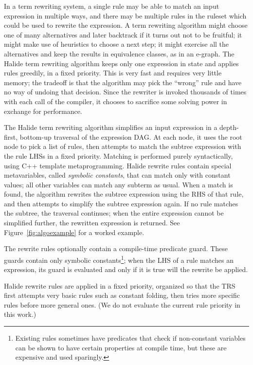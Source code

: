 In a term rewriting system, a single rule may be able to match an input expression in 
multiple ways, and there may be multiple rules in the ruleset which could be used 
to rewrite the expression. A term rewriting algorithm might choose one of many alternatives 
and later backtrack if it turns out not to be fruitful; it might make use of 
heuristics to choose a next step; it might exercise all the alternatives and keep 
the results in equivalence classes, as in an e-graph. The Halide term rewriting algorithm
keeps only one expression in state and applies rules greedily, in a fixed priority.
This is very fast and requires very little memory; the tradeoff is that the algorithm 
may pick the ``wrong'' rule and have no way of undoing that decision. 
Since the rewriter is invoked thousands of times with each call of the compiler, 
it chooses to sacrifice some solving power in exchange for performance.

The Halide term rewriting algorithm simplifies an input expression in a
depth-first, bottom-up traversal of the expression DAG. At each node, it 
uses the root node to pick a list of rules, then
attempts to match the subtree expression with the rule LHSs in a fixed priority. Matching
is performed purely syntactically, using C++ template metaprogramming.
 Halide rewrite rules contain special metavariables,
called \emph{symbolic constants}, that can match only with constant values; all other
variables can match any subterm as usual.
When a match is found, the algorithm rewrites the
subtree expression using the RHS of that rule, and then attempts to simplify the
subtree expression again. If no rule matches the subtree, the traversal
continues; when the entire expression cannot be simplified further, the
rewritten expression is returned. See Figure~\ref{fig:algoexample} for a worked
example.

The rewrite rules optionally contain a compile-time predicate guard. 
These guards contain only symbolic constants\footnote{Existing 
rules sometimes have predicates that check if
  non-constant variables can be shown to have certain properties at compile
  time, but these are expensive and used sparingly.}; when the LHS of a rule
matches an expression, its guard is evaluated and only if it
is true will the rewrite be applied.

Halide rewrite rules are applied in a fixed priority, organized so that the TRS 
first attempts very basic rules such as constant folding, then tries more specific 
rules before more general ones. (We do not evaluate the current rule priority in this work.)

